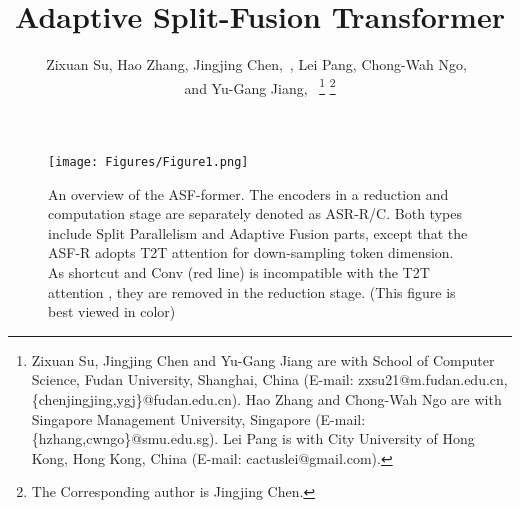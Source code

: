 \documentclass[lettersize,journal]{IEEEtran}
\begin{document}
\title{Adaptive Split-Fusion Transformer}

\author{Zixuan Su, Hao Zhang, Jingjing Chen,~, Lei Pang, Chong-Wah Ngo,~\\ and Yu-Gang Jiang,~
\thanks{Zixuan Su, Jingjing Chen and Yu-Gang Jiang are with School of Computer Science, Fudan University, Shanghai, China (E-mail: zxsu21@m.fudan.edu.cn, \{chenjingjing,ygj\}@fudan.edu.cn). Hao Zhang and Chong-Wah Ngo are with Singapore Management University, Singapore (E-mail: \{hzhang,cwngo\}@smu.edu.sg). Lei Pang is with City University of Hong Kong, Hong Kong, China (E-mail: cactuslei@gmail.com).}
\thanks{The Corresponding author is Jingjing Chen.}
}





\maketitle

\begin{figure*}
\centering
\texttt{[image: Figures/Figure1.png]}
\caption{An overview of the ASF-former. The encoders in a reduction and computation stage are separately denoted as ASR-R/C. Both types include Split Parallelism and Adaptive Fusion parts, except that the ASF-R adopts T2T attention for down-sampling token dimension. As shortcut and Conv ({\color{red}red} line) is incompatible with the T2T attention \cite{yuan2021tokens}, they are removed in the reduction stage. (This figure is best viewed in color)
}
\label{fig:framework}
\end{figure*}
\end{document}
